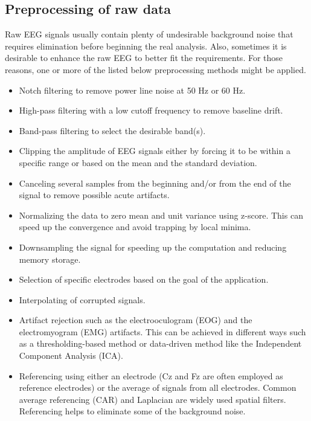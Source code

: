 \documentclass[journal,twocolumn]{IEEEtran}
\begin{document}
\subsection{Preprocessing of raw data}
Raw EEG signals usually contain plenty of undesirable background noise that requires elimination before beginning the real analysis. Also, sometimes it is desirable to enhance the raw EEG to better fit the requirements. For those reasons, one or more of the listed below preprocessing methods \cite{tayeb2019validating, tang2020motor, ludwig2017investigation, reddy2019electroencephalogram} might be applied.

\begin{itemize}
  \item Notch filtering to remove power line noise at 50 Hz or 60 Hz.
  \item High-pass filtering with a low cutoff frequency to remove baseline drift.
  \item Band-pass filtering to select the desirable band(s).
  \item Clipping the amplitude of EEG signals either by forcing it to be within a specific range or based on the mean and the standard deviation.
  \item Canceling several samples from the beginning and/or from the end of the signal to remove possible acute artifacts.
  \item Normalizing the data to zero mean and unit variance using z-score. This can speed up the convergence and avoid trapping by local minima.
  \item Downsampling the signal for speeding up the computation and reducing memory storage.
  \item Selection of specific electrodes based on the goal of the application.
  \item Interpolating of corrupted signals.
  \item Artifact rejection such as the electrooculogram (EOG) and the electromyogram (EMG) artifacts. This can be achieved in different ways such as a thresholding-based method or data-driven method like the Independent Component Analysis (ICA).
  \item Referencing using either an electrode (Cz and Fz are often employed as reference electrodes) or the average of signals from all electrodes. Common average referencing (CAR) and Laplacian are widely used spatial filters. Referencing helps to eliminate some of the background noise.
\end{itemize}
\end{document}
